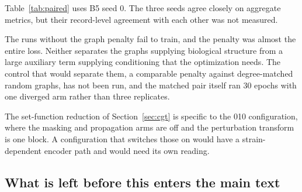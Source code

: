 Table~\ref{tab:paired} uses B5 seed 0. The three seeds agree closely on aggregate
metrics, but their record-level agreement with each other was not measured.

The runs without the graph penalty fail to train, and the penalty was almost the
entire loss. Neither separates the graphs supplying biological structure from a
large auxiliary term supplying conditioning that the optimization needs. The
control that would separate them, a comparable penalty against degree-matched
random graphs, has not been run, and the matched pair itself ran 30 epochs with
one diverged arm rather than three replicates.

The set-function reduction of Section~\ref{sec:cgt} is specific to the 010
configuration, where the masking and propagation arms are off and the
perturbation transform is one block. A configuration that switches those on would
have a strain-dependent encoder path and would need its own reading.
\fi

\subsection{What is left before this enters the main text}

